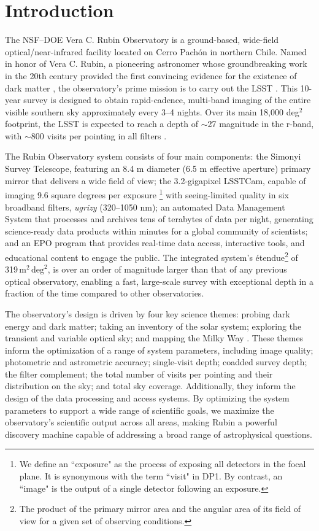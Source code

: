 \section{Introduction}
\label{sec:intro}
The \gls{NSF}–\gls{DOE} Vera C. Rubin Observatory is a ground-based, wide-field optical/near-infrared facility located on Cerro Pach\'on in northern Chile.
Named in honor of Vera C. Rubin, a pioneering astronomer whose groundbreaking work in the 20th century provided the first convincing evidence for the existence of dark matter \citep[][]{1970ApJ...159..379R, 1980ApJ...238..471R}, the observatory’s prime mission is to carry out the \gls{LSST} \citep{2019ApJ...873..111I}.
This 10-year survey is designed to obtain rapid-cadence, multi-band imaging of the entire visible southern sky approximately every 3–4 nights. 
Over its main 18,000 deg$^2$ footprint, the LSST is expected to reach a depth of $\sim$27 magnitude in the r-band, with $\sim$800 visits per pointing in all filters \citep[][]{2022ApJS..258....1B}.

The Rubin Observatory system consists of four main components: the \gls{Simonyi Survey Telescope}, featuring an 8.4 m diameter (6.5 m effective aperture) primary mirror that delivers a wide field of view; the 3.2-gigapixel \gls{LSSTCam}, capable of imaging 9.6 square degrees per exposure
\footnote{We define an ``exposure" as the process of exposing all  detectors in the focal plane. It is synonymous with the term ``visit" in 	DP1. By contrast, an ``image" is the output of a single detector following an exposure.} 
with seeing-limited quality in six broadband filters, \textit{ugrizy} (320--1050 nm); an automated \gls{Data Management System} that processes and archives tens of terabytes of data per night, generating science-ready data products within minutes for a global community of scientists; and an \gls{EPO} program that provides real-time data access, interactive tools, and educational content to engage the public.
The integrated system's \'etendue\footnote{The product of the primary mirror area and the angular area of its field of view for a given set of observing conditions.} of 319\,$\text{m}^2\,\text{deg}^2$, is over an order of magnitude larger than that of any previous optical observatory, enabling a fast, large-scale survey with exceptional depth in a fraction of the time compared to other observatories.

The observatory's design is driven by four key science themes: probing dark energy and dark matter; taking an inventory of the solar system; exploring the transient and variable optical sky; and mapping the Milky Way \citep{2019ApJ...873..111I}.
These themes inform the optimization of a range of system parameters, including image quality; photometric and astrometric accuracy; single-visit depth; coadded survey depth; the filter complement; the total number of visits per pointing and their distribution on the sky; and total sky coverage.
Additionally, they inform the design of the data processing and access systems.
By optimizing the system parameters to support a wide range of scientific goals, we maximize the observatory's scientific output across all areas, making Rubin a powerful discovery machine capable of addressing a broad range of astrophysical questions.

